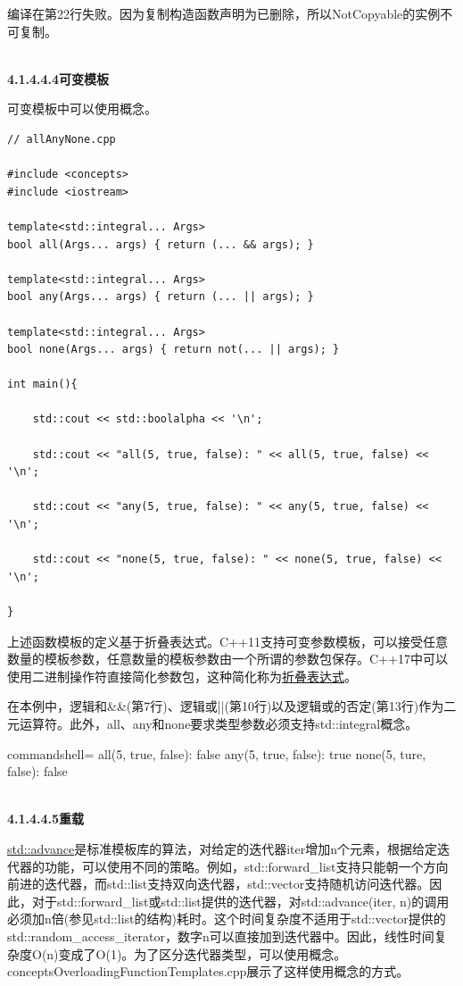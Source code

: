 编译在第22行失败。因为复制构造函数声明为已删除，所以NotCopyable的实例不可复制。

\hspace*{\fill} \\ %
\noindent
\textbf{4.1.4.4.4\hspace{0.2cm}可变模板}

可变模板中可以使用概念。

\begin{lstlisting}[style=styleCXX]
// allAnyNone.cpp

#include <concepts>
#include <iostream>

template<std::integral... Args>
bool all(Args... args) { return (... && args); }

template<std::integral... Args>
bool any(Args... args) { return (... || args); }

template<std::integral... Args>
bool none(Args... args) { return not(... || args); }

int main(){

	std::cout << std::boolalpha << '\n';

	std::cout << "all(5, true, false): " << all(5, true, false) << '\n';

	std::cout << "any(5, true, false): " << any(5, true, false) << '\n';

	std::cout << "none(5, true, false): " << none(5, true, false) << '\n';

}
\end{lstlisting}

上述函数模板的定义基于折叠表达式。C++11支持可变参数模板，可以接受任意数量的模板参数，任意数量的模板参数由一个所谓的参数包保存。C++17中可以使用二进制操作符直接简化参数包，这种简化称为\href{https://www.modernescpp.com/index.php/fold-expressions}{折叠表达式}。

在本例中，逻辑和\&\&(第7行)、逻辑或||(第10行)以及逻辑或的否定(第13行)作为二元运算符。此外，all、any和none要求类型参数必须支持std::integral概念。

\begin{tcblisting}{commandshell={}}
all(5, true, false): false
any(5, true, false): true
none(5, ture, false): false
\end{tcblisting}

\hspace*{\fill} \\ %
\noindent
\textbf{4.1.4.4.5\hspace{0.2cm}重载}

\href{https://en.cppreference.com/w/cpp/iterator/advance}{std::advance}是标准模板库的算法，对给定的迭代器iter增加n个元素，根据给定迭代器的功能，可以使用不同的策略。例如，std::forward\_list支持只能朝一个方向前进的迭代器，而std::list支持双向迭代器，std::vector支持随机访问迭代器。因此，对于std::forward\_list或std::list提供的迭代器，对std::advance(iter, n)的调用必须加n倍(参见std::list的结构)耗时。这个时间复杂度不适用于std::vector提供的std::random\_access\_iterator，数字n可以直接加到迭代器中。因此，线性时间复杂度O(n)变成了O(1)。为了区分迭代器类型，可以使用概念。conceptsOverloadingFunctionTemplates.cpp展示了这样使用概念的方式。

